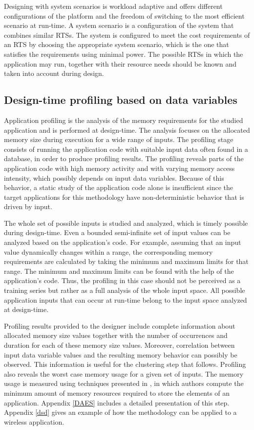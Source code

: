Designing with system scenarios is workload adaptive and offers different configurations of the platform and the freedom of switching to the most efficient scenario at run-time. 
A system scenario is a configuration of the system that combines similar RTSs.
The system is configured to meet the cost requirements of an RTS by choosing the appropriate system scenario, which is the one that satisfies the requirements using minimal power.
The possible RTSs  in which the application may run, together with their resource needs should be known and taken into account during design.  



\subsection{Design-time profiling based on data variables}

Application profiling is the analysis of the memory requirements for the studied application and is performed at design-time.
The analysis focuses on the allocated memory size during execution  for a wide range of inputs. 
The profiling stage consists of running the application code with suitable input data often found in a database, in order to produce profiling results.  
The profiling reveals parts of the application code with high memory activity and with varying memory access intensity, which possibly depends on input data variables. 
Because of this behavior, a static study of the application code alone is insufficient since the target applications for this methodology have non-deterministic behavior that is driven by input.

The whole set of possible inputs is studied and analyzed, which is timely possible during design-time.
Even a bounded semi-infinite set of input values can be analyzed based on the application's code.
For example, assuming that an input value dynamically changes within a range, the corresponding memory requirements are calculated by taking the minimum and maximum limits for that range.
The minimum and maximum limits can be found with the help of the application's code.
Thus, the profiling in this case should not be perceived as a training series but rather as a full analysis of the whole input space.
All possible application inputs that can occur at run-time belong to the input space analyzed at design-time.

Profiling results provided to the designer include complete information about allocated memory size values together with the number of occurrences and duration for each of these memory size values. 
Moreover, correlation between input data variable values and the resulting memory behavior can possibly be observed. 
This information is useful for the clustering step that follows. 
Profiling also reveals the worst case memory usage for a given set of inputs. 
The memory usage is measured using techniques presented in \cite{Ang13b}, in which authors compute the minimum amount of memory resources required to store the elements of an application. 
Appendix \ref{DAES} includes a detailed presentation of this step. Appendix \ref{dsd} gives an example of how the methodology can be applied to a wireless application.

